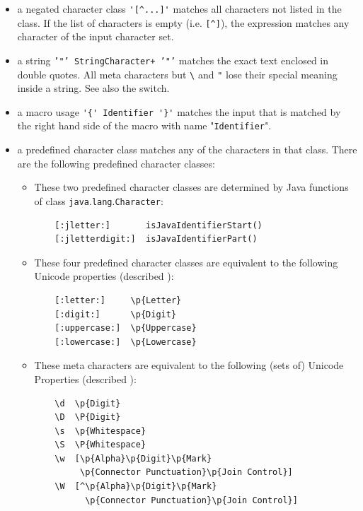 \documentclass[11pt]{scrartcl}
\begin{document}
\begin{itemize}
\begin{itemize}
  \end{itemize}

\item 
  a negated character class \verb:'[^...]':  matches all characters not
  listed in the class. If the list of characters is empty (i.e. 
  \verb+[^]+), the expression matches any character of the input
  character set.
  
\item
  a string \texttt{'"' StringCharacter+ '"'} matches the exact text
  enclosed in double quotes. All meta characters but \verb+\+ and
  \texttt{"} lose their special meaning inside a string. See also the
   switch.
    
\item
  a macro usage \verb+'{' Identifier '}'+ matches the input that is matched
  by the right hand side of the macro with name "\texttt{Identifier}".

\label{predefCharCl}
\item 
  a predefined character class matches any of
  the characters in that class. There are the following predefined character
  classes:

  \begin{itemize}
  \item
    These two predefined character classes are determined by Java functions of
    class \texttt{java}.\texttt{lang}.\texttt{Cha\-rac\-ter}:

    \begin{verbatim}
    [:jletter:]       isJavaIdentifierStart()
    [:jletterdigit:]  isJavaIdentifierPart()
    \end{verbatim}

  \item
    These four predefined character classes are equivalent to the following
    Unicode properties (described ):

    \begin{verbatim}
    [:letter:]     \p{Letter}
    [:digit:]      \p{Digit}
    [:uppercase:]  \p{Uppercase}
    [:lowercase:]  \p{Lowercase}
    \end{verbatim}

  \item
    These meta characters are equivalent to the following (sets of) Unicode
    Properties (described ):
    
    \begin{verbatim}
    \d  \p{Digit}
    \D  \P{Digit}
    \s  \p{Whitespace}
    \S  \P{Whitespace}
    \w  [\p{Alpha}\p{Digit}\p{Mark}
         \p{Connector Punctuation}\p{Join Control}]
    \W  [^\p{Alpha}\p{Digit}\p{Mark}
          \p{Connector Punctuation}\p{Join Control}]
    \end{verbatim}
    

\end{itemize}
\end{itemize}
\end{document}
